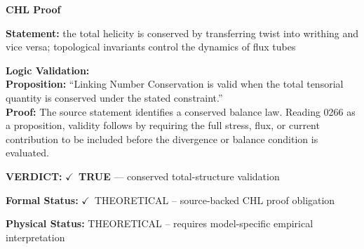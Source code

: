 \vspace{0.45em}
\noindent\textbf{CHL Proof}\par
\textbf{Statement:} the total helicity is conserved by transferring twist into writhing and vice versa;
topological invariants control the dynamics of flux tubes

\textbf{Logic Validation:}\\
\textbf{Proposition:} ``Linking Number Conservation is valid when the total tensorial quantity is conserved
under the stated constraint.''\\
\textbf{Proof:} The source statement identifies a conserved balance law. Reading 0266 as a proposition,
validity follows by requiring the full stress, flux, or current contribution to be
included before the divergence or balance condition is evaluated.

\textbf{VERDICT:} \ensuremath{\checkmark}\ \textbf{TRUE} --- conserved total-structure validation

\textbf{Formal Status:} \ensuremath{\checkmark}\ THEORETICAL -- source-backed CHL proof obligation

\textbf{Physical Status:} THEORETICAL -- requires model-specific empirical interpretation
\par\vspace{0.45em}
\par
\ifTZPDarkEdition
{}
\fi
\endgroup
\endgroup
